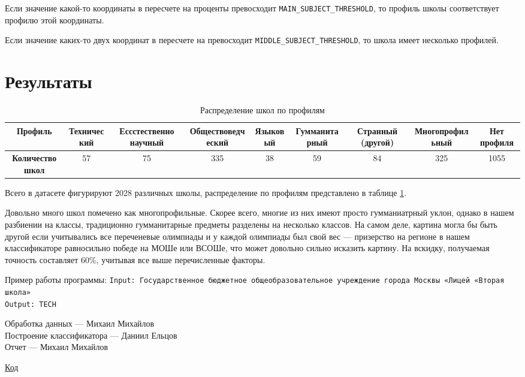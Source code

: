 \documentclass{article}
\begin{document}
Если значение какой-то координаты в пересчете на проценты превосходит 
\texttt{MAIN\_SUBJECT\_THRESHOLD}, то профиль школы соответствует профилю этой координаты. 

Если значение каких-то двух координат в пересчете на превосходит \texttt{MIDDLE\_SUBJECT\_THRESHOLD}, то школа имеет несколько профилей.

\section{Результаты}

\begin{table}[h!]
\centering
\resizebox{\columnwidth}{!}
{
    \begin{tabular}{|c|c|c|c|c|c|c|c|c|}
    \hline
    \textbf{Профиль}         & Технический & Ессстественно научный & Обществоведческий & Языковый & Гумманитарный & Странный (другой) & Многопрофильный & Нет профиля \\ \hline
    \textbf{Количество школ} & 57          & 75                    & 335               & 38       & 59            & 84                & 325             & 1055        \\ \hline
    \end{tabular}
}
    \caption{Распределение школ по профилям}
    \label{tab1}
\end{table}

Всего в датасете фигурируют 2028 различных школы, распределение по профилям представлено в таблице \ref{tab1}.

Довольно много школ помечено как многопрофильные. Скорее всего, многие из них имеют просто гумманиатрный уклон, однако в нашем разбиении на классы, традиционно гумманитарные предметы разделены на несколько классов. На самом деле, картина могла бы быть другой если учитывались все переченевые олимпиады и у каждой олимпиады был свой вес --- призерство на регионе в нашем классификаторе равносильно победе на МОШе или ВСОШе, что может довольно сильно исказить картину. На вскидку, получаемая точность составляет 60\%, учитывая все выше перечисленные факторы.

Пример работы программы:
\texttt{Input: Государственное бюджетное общеобразовательное учреждение города Москвы «Лицей «Вторая школа»} \\
\texttt{Output: TECH}


Обработка данных --- Михаил Михайлов\\
Построение классификатора --- Даниил Ельцов\\
Отчет --- Михаил Михайлов

\href{https://github.com/Desiment/ml-study/tree/main/classification-tree}{Код}
\end{document}

